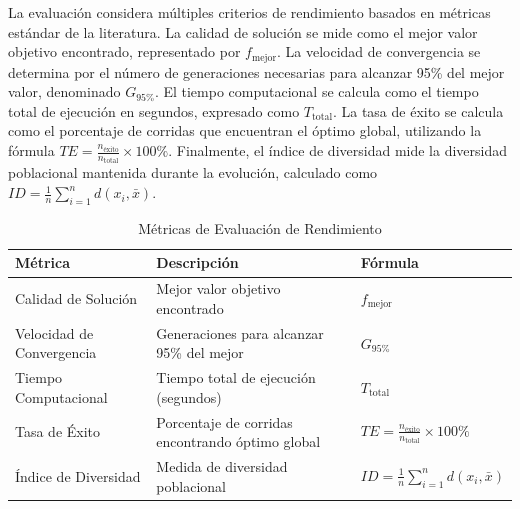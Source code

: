 \documentclass[10pt,a4paper]{article}
\begin{document}
La evaluación considera múltiples criterios de rendimiento basados en métricas estándar de la literatura. La calidad de solución se mide como el mejor valor objetivo encontrado, representado por $f_{\text{mejor}}$. La velocidad de convergencia se determina por el número de generaciones necesarias para alcanzar 95\% del mejor valor, denominado $G_{95\%}$. El tiempo computacional se calcula como el tiempo total de ejecución en segundos, expresado como $T_{\text{total}}$. La tasa de éxito se calcula como el porcentaje de corridas que encuentran el óptimo global, utilizando la fórmula $TE = \frac{n_{\text{éxito}}}{n_{\text{total}}} \times 100\%$. Finalmente, el índice de diversidad mide la diversidad poblacional mantenida durante la evolución, calculado como $ID = \frac{1}{n}\sum_{i=1}^{n}d(x_i, \bar{x})$.

\begin{table}[H]
\centering
\caption{Métricas de Evaluación de Rendimiento}
\begin{tabular}{@{}lll@{}}
\toprule
\textbf{Métrica} & \textbf{Descripción} & \textbf{Fórmula} \\
\midrule
Calidad de Solución & Mejor valor objetivo encontrado & $f_{\text{mejor}}$ \\
Velocidad de Convergencia & Generaciones para alcanzar 95\% del mejor & $G_{95\%}$ \\
Tiempo Computacional & Tiempo total de ejecución (segundos) & $T_{\text{total}}$ \\
Tasa de Éxito & Porcentaje de corridas encontrando óptimo global & $TE = \frac{n_{\text{éxito}}}{n_{\text{total}}} \times 100\%$ \\
Índice de Diversidad & Medida de diversidad poblacional & $ID = \frac{1}{n}\sum_{i=1}^{n}d(x_i, \bar{x})$ \\
\bottomrule
\end{tabular}
\label{tab:metrics}
\end{table}
\end{document}
